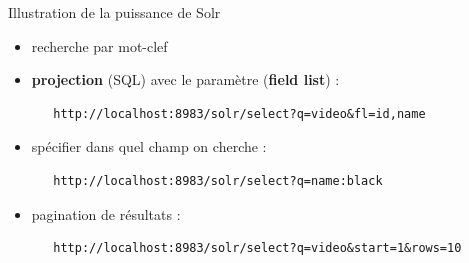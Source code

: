 \begin{frame}[fragile]{Illustration de la puissance de Solr}
 \begin{itemize}
   \item recherche par mot-clef
   \item {\bf projection} (SQL) avec le paramètre  ({\bf field list}) :\\
\begin{verbatim}
   http://localhost:8983/solr/select?q=video&fl=id,name
\end{verbatim}
\item spécifier dans quel champ on cherche :\\
\begin{verbatim}
   http://localhost:8983/solr/select?q=name:black  
\end{verbatim}
\item pagination de résultats :\\

\begin{verbatim}
   http://localhost:8983/solr/select?q=video&start=1&rows=10
\end{verbatim}
\end{itemize}
\end{frame}

